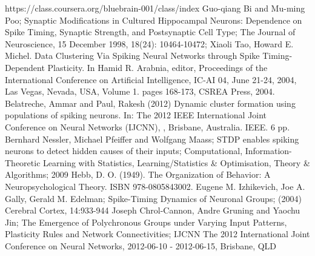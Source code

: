 \documentclass[a4paper,10pt]{article}
\begin{document}
\begin{thebibliography}{9}
https://class.coursera.org/bluebrain-001/class/index
Guo-qiang Bi and Mu-ming Poo; Synaptic Modifications in Cultured Hippocampal Neurons: Dependence on Spike Timing, Synaptic Strength, and Postsynaptic Cell Type; The Journal of Neuroscience, 15 December 1998, 18(24): 10464-10472;
Xiaoli Tao, Howard E. Michel. Data Clustering Via Spiking Neural Networks through Spike Timing-Dependent Plasticity. In Hamid R. Arabnia, editor, Proceedings of the International Conference on Artificial Intelligence, IC-AI 04, June 21-24, 2004, Las Vegas, Nevada, USA, Volume 1. pages 168-173, CSREA Press, 2004.
Belatreche, Ammar and Paul, Rakesh (2012) Dynamic cluster formation using populations of spiking neurons. In: The 2012 IEEE International Joint Conference on Neural Networks (IJCNN), , Brisbane, Australia. IEEE. 6 pp.
Bernhard Nessler, Michael Pfeiffer and Wolfgang Maass; STDP enables spiking neurons to detect hidden causes of their inputs; Computational, Information-Theoretic Learning with Statistics, Learning/Statistics \& Optimisation, Theory \& Algorithms; 2009
Hebb, D. O. (1949). The Organization of Behavior: A Neuropsychological Theory. ISBN 978-0805843002.
Eugene M. Izhikevich, Joe A. Gally, Gerald M. Edelman; Spike-Timing Dynamics of Neuronal Groups; (2004) Cerebral Cortex, 14:933-944
Joseph Chrol-Cannon, Andre Gruning and Yaochu Jin; The Emergence of Polychronous Groups under Varying Input Patterns, Plasticity Rules and Network Connectivities; IJCNN The 2012 International Joint Conference on Neural Networks, 2012-06-10 - 2012-06-15, Brisbane, QLD
\end{thebibliography}
\end{document}
